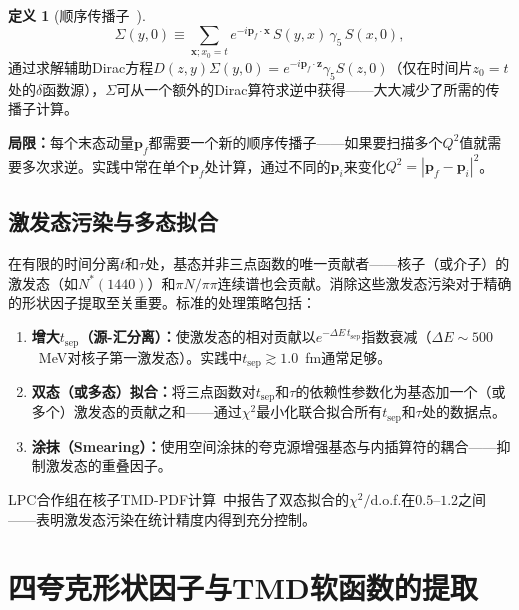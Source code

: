 \documentclass[12pt,a4paper]{ctexart}
\theoremstyle{definition}
\newtheorem{definition}{定义}[section]
\begin{document}
\begin{definition}[顺序传播子~\cite{GattringerLang2010}]
\begin{equation}
\Sigma(y, 0) \equiv \sum_{\mathbf{x}; x_0 = t} e^{-i\mathbf{p}_f\cdot\mathbf{x}} \, S(y, x) \, \gamma_5 \, S(x, 0),
\label{eq:sequential_prop}
\end{equation}
通过求解辅助Dirac方程$D(z,y)\Sigma(y,0) = e^{-i\mathbf{p}_f\cdot\mathbf{z}}\gamma_5 S(z,0)$（仅在时间片$z_0=t$处的$\delta$函数源），$\Sigma$可从一个额外的Dirac算符求逆中获得——大大减少了所需的传播子计算。
\end{definition}

\textbf{局限：}每个末态动量$\mathbf{p}_f$都需要一个新的顺序传播子——如果要扫描多个$Q^2$值就需要多次求逆。实践中常在单个$\mathbf{p}_f$处计算，通过不同的$\mathbf{p}_i$来变化$Q^2 = |\mathbf{p}_f - \mathbf{p}_i|^2$。

\subsection{激发态污染与多态拟合}

在有限的时间分离$t$和$\tau$处，基态并非三点函数的唯一贡献者——核子（或介子）的激发态（如$N^*(1440)$）和$\pi N/\pi\pi$连续谱也会贡献。消除这些激发态污染对于精确的形状因子提取至关重要。标准的处理策略包括：

\begin{enumerate}[nosep]
    \item \textbf{增大$t_{\text{sep}}$（源-汇分离）：}使激发态的相对贡献以$e^{-\Delta E\, t_{\text{sep}}}$指数衰减（$\Delta E \sim 500$~MeV对核子第一激发态）。实践中$t_{\text{sep}} \gtrsim 1.0$~fm通常足够。
    \item \textbf{双态（或多态）拟合：}将三点函数对$t_{\text{sep}}$和$\tau$的依赖性参数化为基态加一个（或多个）激发态的贡献之和——通过$\chi^2$最小化联合拟合所有$t_{\text{sep}}$和$\tau$处的数据点。
    \item \textbf{涂抹（Smearing）：}使用空间涂抹的夸克源增强基态与内插算符的耦合——抑制激发态的重叠因子。
\end{enumerate}

LPC合作组在核子TMD-PDF计算~\cite{He2024unpolTMD}中报告了双态拟合的$\chi^2/$d.o.f.在$0.5\text{--}1.2$之间——表明激发态污染在统计精度内得到充分控制。

\section{四夸克形状因子与TMD软函数的提取}
\end{document}
